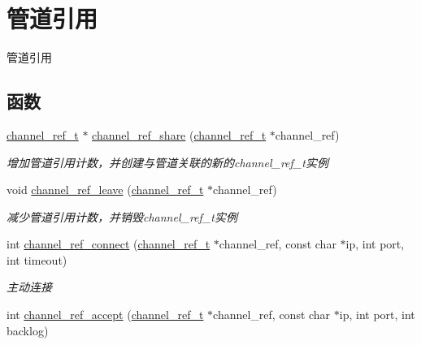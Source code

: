 \hypertarget{a00084}{}\section{管道引用}
\label{a00084}


管道引用  


\subsection*{函数}
\begin{DoxyCompactItemize}
\item 
\hyperlink{a00044_a151271c9d188ef28d4d24bb81dcc1263_a151271c9d188ef28d4d24bb81dcc1263}{channel\+\_\+ref\+\_\+t} $\ast$ \hyperlink{a00084_ga7b76c4078bbe8272206a5d7467ccd4ed_ga7b76c4078bbe8272206a5d7467ccd4ed}{channel\+\_\+ref\+\_\+share} (\hyperlink{a00044_a151271c9d188ef28d4d24bb81dcc1263_a151271c9d188ef28d4d24bb81dcc1263}{channel\+\_\+ref\+\_\+t} $\ast$channel\+\_\+ref)
\begin{DoxyCompactList}\small\item\em 增加管道引用计数，并创建与管道关联的新的channel\+\_\+ref\+\_\+t实例 \end{DoxyCompactList}\item 
void \hyperlink{a00084_gab4248c6e10ac538b5d37b927bbe39ef1_gab4248c6e10ac538b5d37b927bbe39ef1}{channel\+\_\+ref\+\_\+leave} (\hyperlink{a00044_a151271c9d188ef28d4d24bb81dcc1263_a151271c9d188ef28d4d24bb81dcc1263}{channel\+\_\+ref\+\_\+t} $\ast$channel\+\_\+ref)
\begin{DoxyCompactList}\small\item\em 减少管道引用计数，并销毁channel\+\_\+ref\+\_\+t实例 \end{DoxyCompactList}\item 
int \hyperlink{a00084_ga1a8d1f5550cf26313cbb6575e8b2a32c_ga1a8d1f5550cf26313cbb6575e8b2a32c}{channel\+\_\+ref\+\_\+connect} (\hyperlink{a00044_a151271c9d188ef28d4d24bb81dcc1263_a151271c9d188ef28d4d24bb81dcc1263}{channel\+\_\+ref\+\_\+t} $\ast$channel\+\_\+ref, const char $\ast$ip, int port, int timeout)
\begin{DoxyCompactList}\small\item\em 主动连接 \end{DoxyCompactList}\item 
int \hyperlink{a00084_gae9ae0ae2a42eabf6a544ce4e0f001c9e_gae9ae0ae2a42eabf6a544ce4e0f001c9e}{channel\+\_\+ref\+\_\+accept} (\hyperlink{a00044_a151271c9d188ef28d4d24bb81dcc1263_a151271c9d188ef28d4d24bb81dcc1263}{channel\+\_\+ref\+\_\+t} $\ast$channel\+\_\+ref, const char $\ast$ip, int port, int backlog)

\end{DoxyCompactItemize}
